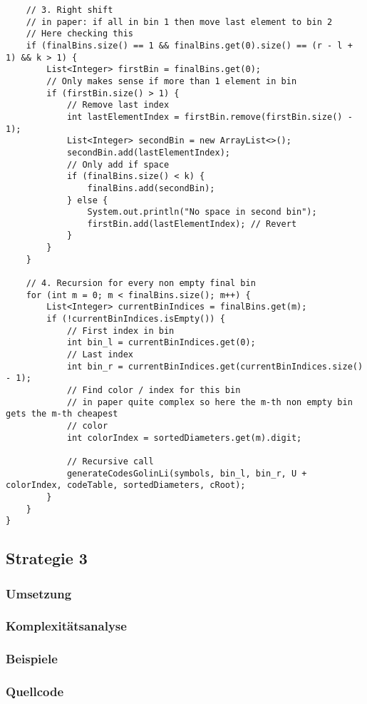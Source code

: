 \documentclass[a4paper,10pt,ngerman]{scrartcl}
\begin{document}
\begin{lstlisting}
    // 3. Right shift
    // in paper: if all in bin 1 then move last element to bin 2
    // Here checking this
    if (finalBins.size() == 1 && finalBins.get(0).size() == (r - l + 1) && k > 1) {
        List<Integer> firstBin = finalBins.get(0);
        // Only makes sense if more than 1 element in bin
        if (firstBin.size() > 1) {
            // Remove last index
            int lastElementIndex = firstBin.remove(firstBin.size() - 1);
            List<Integer> secondBin = new ArrayList<>();
            secondBin.add(lastElementIndex);
            // Only add if space
            if (finalBins.size() < k) {
                finalBins.add(secondBin);
            } else {
                System.out.println("No space in second bin");
                firstBin.add(lastElementIndex); // Revert
            }
        }
    }

    // 4. Recursion for every non empty final bin
    for (int m = 0; m < finalBins.size(); m++) {
        List<Integer> currentBinIndices = finalBins.get(m);
        if (!currentBinIndices.isEmpty()) {
            // First index in bin
            int bin_l = currentBinIndices.get(0);
            // Last index
            int bin_r = currentBinIndices.get(currentBinIndices.size() - 1);
            // Find color / index for this bin
            // in paper quite complex so here the m-th non empty bin gets the m-th cheapest
            // color
            int colorIndex = sortedDiameters.get(m).digit;

            // Recursive call
            generateCodesGolinLi(symbols, bin_l, bin_r, U + colorIndex, codeTable, sortedDiameters, cRoot);
        }
    }
}
\end{lstlisting}

\subsection{Strategie 3}
\subsubsection{Umsetzung}
\subsubsection{Komplexitätsanalyse}
\subsubsection{Beispiele}
\subsubsection{Quellcode}
\end{document}
